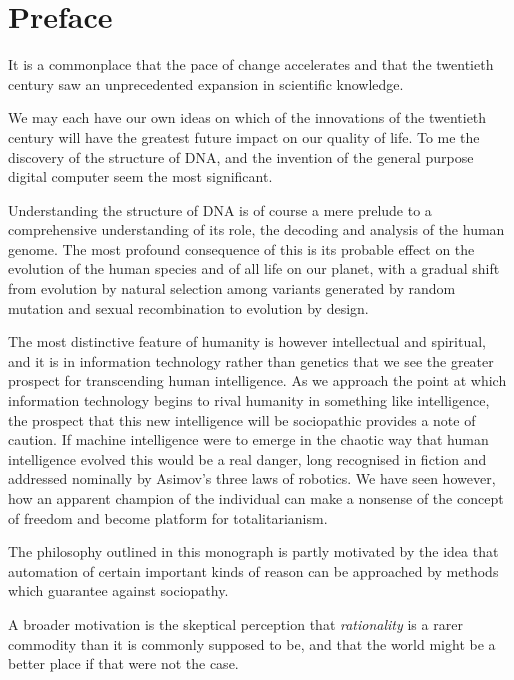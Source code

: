 \def\rbjidpreface{$$Id: preface.tex,v 1.1 2011/11/04 16:38:42 rbj Exp $$}

\section*{Preface}\label{Preface}

It is a commonplace that the pace of change accelerates and that the twentieth century saw an unprecedented expansion in scientific knowledge.

We may each have our own ideas on which of the innovations of the twentieth century will have the greatest future impact on our quality of life.
To me the discovery of the structure of DNA, and the invention of the general purpose digital computer seem the most significant.

Understanding the structure of DNA is of course a mere prelude to a comprehensive understanding of its role, the decoding and analysis of the human genome.
The most profound consequence of this is its probable effect on the evolution of the human species and of all life on our planet, with a gradual shift from evolution by natural selection among variants generated by random mutation and sexual recombination to evolution by design.

The most distinctive feature of humanity is however intellectual and spiritual, and it is in information technology rather than genetics that we see the greater prospect for transcending human intelligence.
As we approach the point at which information technology begins to rival humanity in something like intelligence, the prospect that this new intelligence will be sociopathic provides a note of caution.
If machine intelligence were to emerge in the chaotic way that human intelligence evolved this would be a real danger, long recognised in fiction and addressed nominally by Asimov's three laws of robotics.
We have seen however, how an apparent champion of the individual can make a nonsense of the concept of freedom and become platform for totalitarianism.

The philosophy outlined in this monograph is partly motivated by the idea that automation of certain important kinds of reason can be approached by methods which guarantee against sociopathy.

A broader motivation is the skeptical perception that \emph{rationality} is a rarer commodity than it is commonly supposed to be, and that the world might be a better place if that were not the case.

\mainmatter
